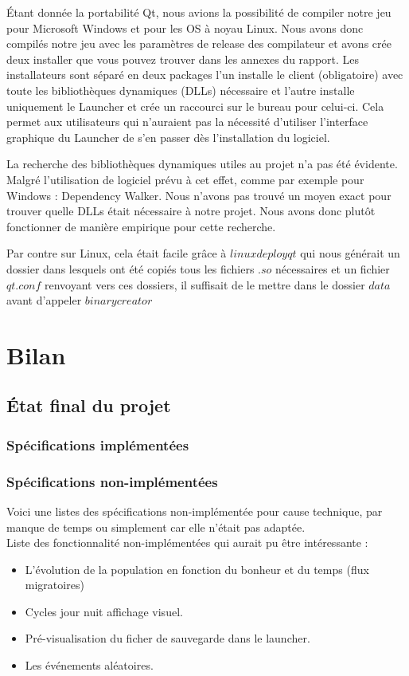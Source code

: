 \documentclass[a4paper,10pt,openany,oneside]{report}
\begin{document}
Étant donnée la portabilité Qt, nous avions la possibilité de compiler notre jeu pour Microsoft Windows et pour les OS à noyau Linux. Nous avons donc compilés notre jeu avec les paramètres de release des compilateur et avons crée deux installer que vous pouvez trouver dans les annexes du rapport.
Les installateurs sont séparé en deux packages l'un installe le client (obligatoire) avec toute les bibliothèques dynamiques (DLLs) nécessaire et l'autre installe uniquement le Launcher et crée un raccourci sur le bureau pour celui-ci.
Cela permet aux utilisateurs qui n'auraient pas la nécessité d'utiliser l'interface graphique du Launcher de s'en passer dès l'installation du logiciel.
\newline

La recherche des bibliothèques dynamiques utiles au projet n'a pas été évidente. Malgré l'utilisation de logiciel prévu à cet effet, comme par exemple pour Windows : Dependency Walker. Nous n'avons pas trouvé un moyen exact pour trouver quelle DLLs était nécessaire à notre projet. Nous avons donc plutôt fonctionner de manière empirique pour cette recherche.
\newline

Par contre sur Linux, cela était facile grâce à $linuxdeployqt$ qui nous générait un dossier dans lesquels ont été copiés tous les fichiers $.so$ nécessaires et un fichier $qt.conf$ renvoyant vers ces dossiers, il suffisait de le mettre dans le dossier $data$ avant d'appeler $binarycreator$



\chapter{Bilan}
\thispagestyle{headings}
\section{État final du projet}
\subsection{Spécifications implémentées}
\subsection{Spécifications non-implémentées}
Voici une listes des spécifications non-implémentée pour cause technique, par manque de temps ou simplement car elle n'était pas adaptée. \\
Liste des fonctionnalité non-implémentées qui aurait pu être intéressante :
\begin{itemize}
	\item L'évolution de la population en fonction du bonheur et du temps (flux migratoires)
	\item Cycles jour nuit affichage visuel.
	\item Pré-visualisation du ficher de sauvegarde dans le launcher.
	\item Les événements aléatoires.
\end{itemize}
\end{document}
